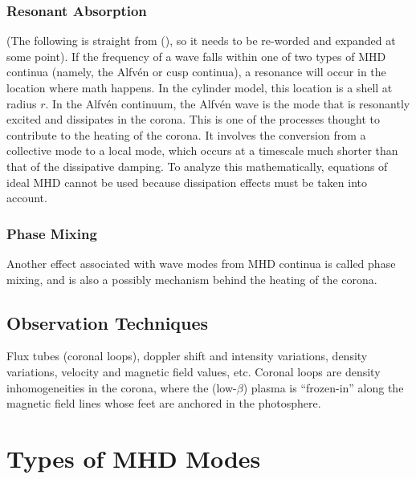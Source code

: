 \documentclass[preprint2]{aastex}
\begin{document}
\subsubsection{Resonant Absorption}
(The following is straight from (\cite{Nak}), so it needs to be
re-worded and expanded at some point).
If the frequency of a wave falls within one of two types of MHD
continua (namely, the Alfv\'en or cusp continua), a resonance will
occur in the location where math happens.
In the cylinder model, this location is a shell at radius $r$.
In the Alfv\'en continuum, the Alfv\'en wave is the mode that is
resonantly excited and dissipates in the corona.
This is one of the processes thought to contribute to the heating
of the corona. It involves the conversion from a collective mode
to a local mode, which occurs at a timescale much shorter than that
of the dissipative damping.
To analyze this mathematically, equations of ideal MHD cannot be used
because dissipation effects must be taken into account.

\subsubsection{Phase Mixing}
Another effect associated with wave modes from MHD continua is called
phase mixing, and is also a possibly mechanism behind the heating of
the corona.
\subsection{Observation Techniques}
Flux tubes (coronal loops), doppler shift and intensity variations,
density variations, velocity and magnetic field values,
etc. Coronal loops are density inhomogeneities in the corona,
where the (low-$\beta$) plasma is ``frozen-in'' along the magnetic
field lines whose feet are anchored in the photosphere.
\section{Types of MHD Modes}\label{topics}
\end{document}

